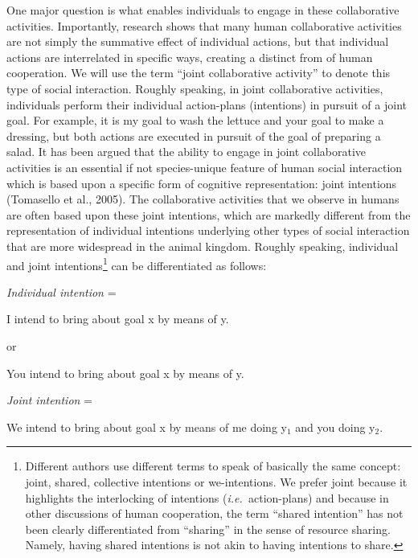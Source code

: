 \documentclass{article}
\newcommand{\ie}{{\textit{i.e.~}}}
\begin{document}
One major question is what enables individuals to engage in these collaborative
activities. Importantly, research shows that many human collaborative
activities are not simply the summative effect of individual actions, but that
individual actions are interrelated in specific ways, creating a distinct from
of human cooperation. We will use the term ``joint collaborative activity''
to denote this type of social interaction. Roughly speaking, in joint
collaborative activities, individuals perform their individual action-plans
(intentions) in pursuit of a joint goal. For example, it is my goal to wash the
lettuce and your goal to make a dressing, but both actions are executed in
pursuit of the goal of preparing a salad. It has been argued that the ability
to engage in joint collaborative activities is an essential if not
species-unique feature of human social interaction which is based upon a
specific form of cognitive representation: joint intentions (Tomasello et al.,
2005). The collaborative activities that we observe in humans are often based
upon these joint intentions, which are markedly different from the
representation of individual intentions underlying other types of social
interaction that are more widespread in the animal kingdom. Roughly speaking,
individual and joint intentions\footnote{ Different authors use different terms
to speak of basically the same concept: joint, shared, collective intentions or
we-intentions. We prefer joint because it highlights the interlocking of
intentions (\ie action-plans) and because in other discussions of human
cooperation, the term ``shared intention'' has not been clearly differentiated
from ``sharing'' in the sense of resource sharing. Namely, having shared
intentions is not akin to having intentions to share.\par } can be
differentiated as follows:

\textit{Individual intention} =

I intend to bring about goal x by means of y.

or

You intend to bring about goal x by means of y.

\textit{Joint intention} = 

We intend to bring about goal x by means of me doing y$_1$ and you
doing y$_2$.
\end{document}
